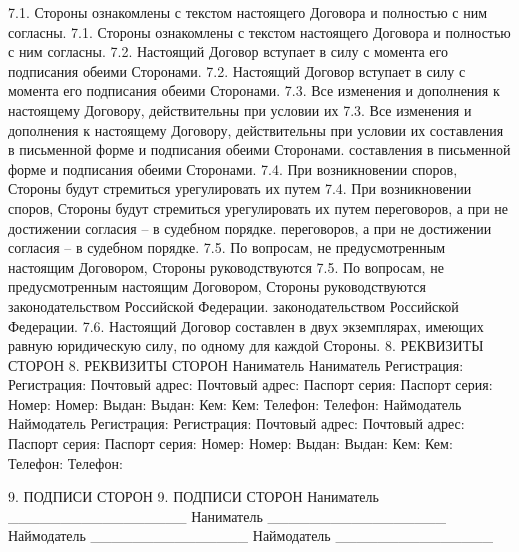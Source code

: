 7.1. Стороны ознакомлены с текстом настоящего Договора и полностью с ним
согласны.
7.1. Стороны ознакомлены с текстом настоящего Договора и полностью с ним
согласны.
7.2. Настоящий Договор вступает в силу с момента его подписания обеими
Сторонами.
7.2. Настоящий Договор вступает в силу с момента его подписания обеими
Сторонами.
7.3. Все изменения и дополнения к настоящему Договору, действительны при условии
их
7.3. Все изменения и дополнения к настоящему Договору, действительны при условии
их
составления в письменной форме и подписания обеими Сторонами.
составления в письменной форме и подписания обеими Сторонами.
7.4. При возникновении споров, Стороны будут стремиться урегулировать их путем
7.4. При возникновении споров, Стороны будут стремиться урегулировать их путем
переговоров, а при не достижении согласия – в судебном порядке.
переговоров, а при не достижении согласия – в судебном порядке.
7.5. По вопросам, не предусмотренным настоящим Договором, Стороны
руководствуются
7.5. По вопросам, не предусмотренным настоящим Договором, Стороны
руководствуются
законодательством Российской Федерации.
законодательством Российской Федерации.
7.6. Настоящий Договор составлен в двух экземплярах, имеющих равную юридическую
силу,
по одному для каждой Стороны.
8. РЕКВИЗИТЫ СТОРОН
8. РЕКВИЗИТЫ СТОРОН
Наниматель
Наниматель
Регистрация:
Регистрация:
Почтовый адрес:
Почтовый адрес:
Паспорт серия:
Паспорт серия:
Номер:
Номер:
Выдан:
Выдан:
Кем:
Кем:
Телефон:
Телефон:
Наймодатель
Наймодатель
Регистрация:
Регистрация:
Почтовый адрес:
Почтовый адрес:
Паспорт серия:
Паспорт серия:
Номер:
Номер:
Выдан:
Выдан:
Кем:
Кем:
Телефон:
Телефон:

9. ПОДПИСИ СТОРОН
9. ПОДПИСИ СТОРОН
Наниматель _________________
Наниматель _________________
Наймодатель _______________
Наймодатель _______________
